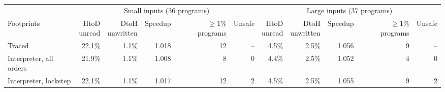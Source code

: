 \begin{tabular}{lrrrrrrrrrr}
\toprule
 & \multicolumn{5}{c}{Small inputs (36 programs)} & \multicolumn{5}{c}{Large inputs (37 programs)} \\
\cmidrule(lr){2-6} \cmidrule(lr){7-11}
Footprints & \shortstack{HtoD\\unread} & \shortstack{DtoH\\unwritten} & Speedup & \shortstack{$\geq$1\%\\programs} & Unsafe & \shortstack{HtoD\\unread} & \shortstack{DtoH\\unwritten} & Speedup & \shortstack{$\geq$1\%\\programs} & Unsafe \\
\midrule
Traced & 22.1\% & 1.1\% & 1.018 & 12 & -- & 4.5\% & 2.5\% & 1.056 & 9 & -- \\
Interpreter, all orders & 21.9\% & 1.1\% & 1.008 & 8 & 0 & 4.4\% & 2.5\% & 1.052 & 4 & 0 \\
Interpreter, lockstep & 22.1\% & 1.1\% & 1.017 & 12 & 2 & 4.5\% & 2.5\% & 1.055 & 9 & 2 \\
\bottomrule
\end{tabular}
